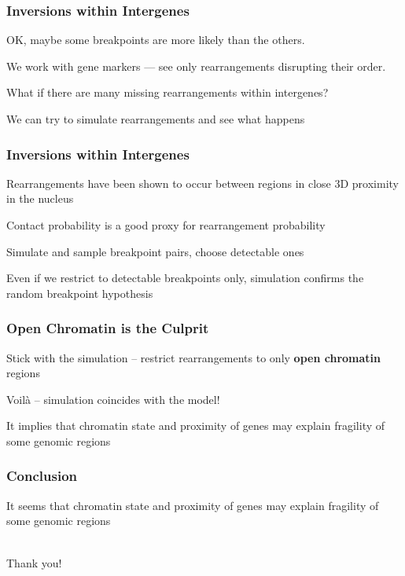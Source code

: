 \documentclass[svgnames,14pt]{beamer}
\begin{document}
\begin{frame}
\frametitle{Inversions within Intergenes}
OK, maybe some breakpoints are more likely than the others.

\vspace{12pt}
We work with gene markers --- see only rearrangements disrupting their order.

\vspace{12pt}
What if there are many missing rearrangements within intergenes?

\vspace{12pt}
We can try to simulate rearrangements and see what happens
\end{frame}

\begin{frame}
\frametitle{Inversions within Intergenes}
Rearrangements have been shown to occur between regions in close 3D proximity in the nucleus

\vspace{12pt}
Contact probability is a good proxy for rearrangement probability

\vspace{12pt}
Simulate and sample breakpoint pairs, choose detectable ones

\vspace{12pt}
Even if we restrict to detectable breakpoints only, simulation confirms the random breakpoint hypothesis
\end{frame}

\begin{frame}
\frametitle{Open Chromatin is the Culprit}
Stick with the simulation -- restrict rearrangements to only \textbf{open chromatin} regions

\vspace{12pt}
Voilà -- simulation coincides with the model!

It implies that chromatin state and proximity of genes may explain fragility of some genomic regions
\end{frame}


\begin{frame}
\frametitle{Conclusion}
It seems that chromatin state and proximity of genes may explain fragility of some genomic regions
\end{frame}

\begin{frame}
\begin{center}
\hfill \huge \\
Thank you!
\end{center}
\end{frame}
\end{document}
